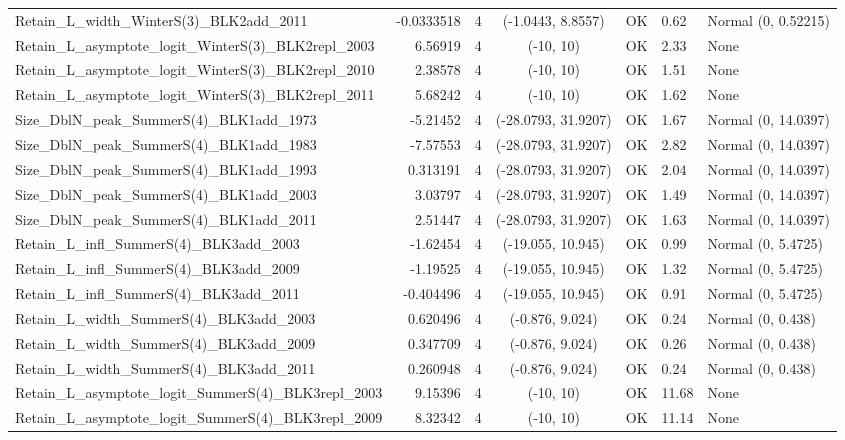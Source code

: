 \documentclass[12pt,]{article}
\begin{document}
\begin{landscape}
\begin{longtable}{lrcccll}
  Retain\_L\_width\_WinterS(3)\_BLK2add\_2011 & -0.0333518 & 4 & (-1.0443, 8.8557) & OK & 0.62 & Normal (0, 0.52215) \\ 
  Retain\_L\_asymptote\_logit\_WinterS(3)\_BLK2repl\_2003 & 6.56919 & 4 & (-10, 10) & OK & 2.33 & None \\ 
  Retain\_L\_asymptote\_logit\_WinterS(3)\_BLK2repl\_2010 & 2.38578 & 4 & (-10, 10) & OK & 1.51 & None \\ 
  Retain\_L\_asymptote\_logit\_WinterS(3)\_BLK2repl\_2011 & 5.68242 & 4 & (-10, 10) & OK & 1.62 & None \\ 
  Size\_DblN\_peak\_SummerS(4)\_BLK1add\_1973 & -5.21452 & 4 & (-28.0793, 31.9207) & OK & 1.67 & Normal (0, 14.0397) \\ 
  Size\_DblN\_peak\_SummerS(4)\_BLK1add\_1983 & -7.57553 & 4 & (-28.0793, 31.9207) & OK & 2.82 & Normal (0, 14.0397) \\ 
  Size\_DblN\_peak\_SummerS(4)\_BLK1add\_1993 & 0.313191 & 4 & (-28.0793, 31.9207) & OK & 2.04 & Normal (0, 14.0397) \\ 
  Size\_DblN\_peak\_SummerS(4)\_BLK1add\_2003 & 3.03797 & 4 & (-28.0793, 31.9207) & OK & 1.49 & Normal (0, 14.0397) \\ 
  Size\_DblN\_peak\_SummerS(4)\_BLK1add\_2011 & 2.51447 & 4 & (-28.0793, 31.9207) & OK & 1.63 & Normal (0, 14.0397) \\ 
  Retain\_L\_infl\_SummerS(4)\_BLK3add\_2003 & -1.62454 & 4 & (-19.055, 10.945) & OK & 0.99 & Normal (0, 5.4725) \\ 
  Retain\_L\_infl\_SummerS(4)\_BLK3add\_2009 & -1.19525 & 4 & (-19.055, 10.945) & OK & 1.32 & Normal (0, 5.4725) \\ 
  Retain\_L\_infl\_SummerS(4)\_BLK3add\_2011 & -0.404496 & 4 & (-19.055, 10.945) & OK & 0.91 & Normal (0, 5.4725) \\ 
  Retain\_L\_width\_SummerS(4)\_BLK3add\_2003 & 0.620496 & 4 & (-0.876, 9.024) & OK & 0.24 & Normal (0, 0.438) \\ 
  Retain\_L\_width\_SummerS(4)\_BLK3add\_2009 & 0.347709 & 4 & (-0.876, 9.024) & OK & 0.26 & Normal (0, 0.438) \\ 
  Retain\_L\_width\_SummerS(4)\_BLK3add\_2011 & 0.260948 & 4 & (-0.876, 9.024) & OK & 0.24 & Normal (0, 0.438) \\ 
  Retain\_L\_asymptote\_logit\_SummerS(4)\_BLK3repl\_2003 & 9.15396 & 4 & (-10, 10) & OK & 11.68 & None \\ 
  Retain\_L\_asymptote\_logit\_SummerS(4)\_BLK3repl\_2009 & 8.32342 & 4 & (-10, 10) & OK & 11.14 & None \\ 

\end{longtable}
\end{landscape}
\end{document}
